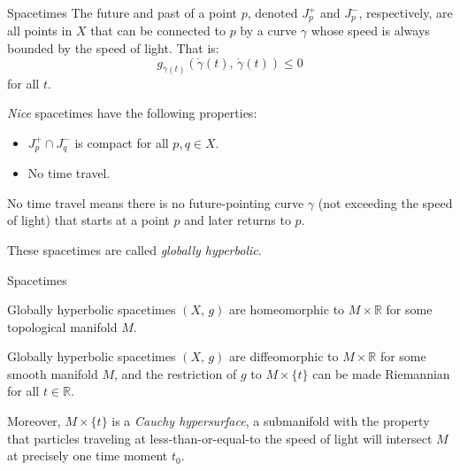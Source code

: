 \documentclass{beamer}
\begin{document}
    \begin{frame}{Spacetimes}
        The future and past of a point $p$, denoted $J_{p}^{+}$ and $J_{p}^{-}$,
        respectively, are all points in $X$ that can be connected to $p$ by a
        curve $\gamma$ whose speed is always bounded by the speed of light.
        That is:
        \begin{equation}
            g_{\gamma(t)}(\dot{\gamma}(t),\,\dot{\gamma}(t))\leq{0}
        \end{equation}
        for all $t$.
        \par\hfill\par
        \textit{Nice} spacetimes have the following properties:
        \begin{itemize}
            \item
                $J_{p}^{+}\cap{J}_{q}^{-}$ is compact for all $p,q\in{X}$.
            \item
                No time travel.
        \end{itemize}
        No time travel means there is no future-pointing curve $\gamma$ (not
        exceeding the speed of light) that starts at a point $p$ and later
        returns to $p$.
        \par\hfill\par
        These spacetimes are called \textit{globally hyperbolic}.
    \end{frame}
    \begin{frame}{Spacetimes}
        \begin{theorem}[Geroch, 1970]
            Globally hyperbolic spacetimes $(X,\,g)$ are homeomorphic to
            $M\times\mathbb{R}$ for some topological manifold $M$.
        \end{theorem}
        \begin{theorem}
            Globally hyperbolic spacetimes $(X,\,g)$ are diffeomorphic to
            $M\times\mathbb{R}$ for some smooth manifold $M$, and the
            restriction of $g$ to $M\times\{t\}$ can be made Riemannian for all
            $t\in\mathbb{R}$.
        \end{theorem}
        Moreover, $M\times\{t\}$ is a \textit{Cauchy hypersurface},
        a submanifold with the property that particles traveling at
        less-than-or-equal-to the speed of light will intersect $M$ at
        precisely one time moment $t_{0}$.
    \end{frame}
\end{document}
